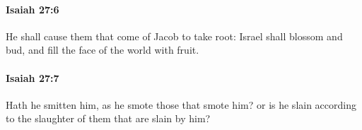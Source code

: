 		\paragraph{Isaiah 27:6} %
			\label{ISAIAH-27-6}

			He shall cause them that come of Jacob to take root: Israel shall blossom and bud, and fill the face of the world with fruit.


		\paragraph{Isaiah 27:7} %
			\label{ISAIAH-27-7}

			Hath he smitten him, as he smote those that smote him? or is he slain according to the slaughter of them that are slain by him?



